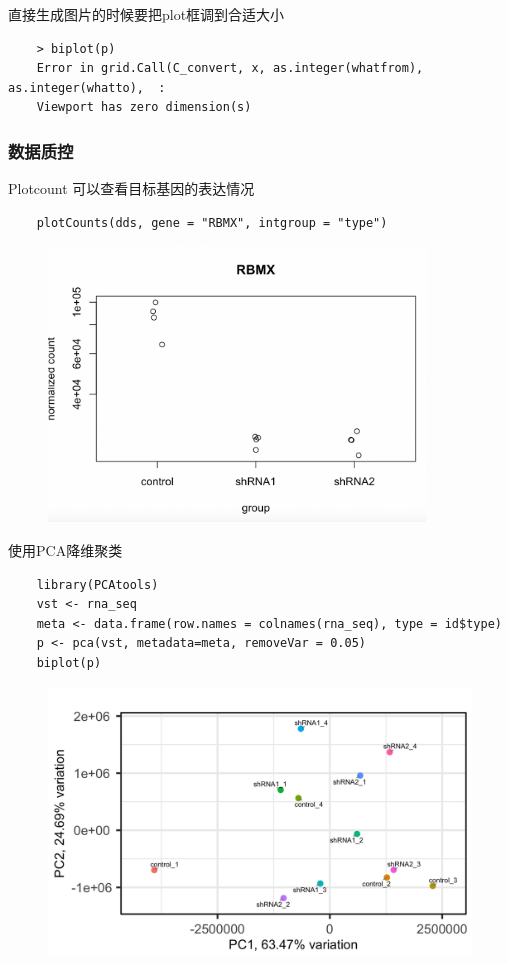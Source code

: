 直接生成图片的时候要把plot框调到合适大小
\begin{lstlisting}
    > biplot(p)
    Error in grid.Call(C_convert, x, as.integer(whatfrom), as.integer(whatto),  :
    Viewport has zero dimension(s)
\end{lstlisting}

\subsubsection{数据质控}
Plotcount 可以查看目标基因的表达情况
\begin{lstlisting}
    plotCounts(dds, gene = "RBMX", intgroup = "type")
\end{lstlisting}

\begin{figure}[ht]
    \centering
    \includegraphics[width=10cm]{image/rnaseq/qc2.png}
\end{figure}

使用PCA降维聚类
\begin{lstlisting}
    library(PCAtools)
    vst <- rna_seq
    meta <- data.frame(row.names = colnames(rna_seq), type = id$type)
    p <- pca(vst, metadata=meta, removeVar = 0.05)
    biplot(p)
\end{lstlisting}

\begin{figure}[ht]
    \centering
    \includegraphics[width=13cm]{image/rnaseq/pca.png}
\end{figure}

